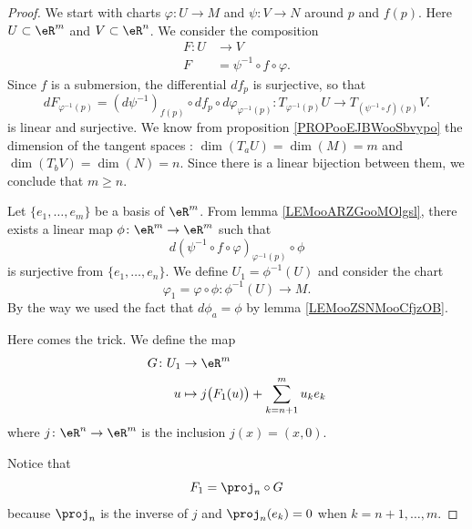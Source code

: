\begin{proof}
	We start with charts \(\varphi \colon U\to M  \) and \(\psi \colon V\to N  \) around \( p\) and \( f(p)\). Here \( U\subset \eR^m\) and \( V\subset \eR^n\). We consider the composition
	\begin{equation}
		\begin{aligned}
			F\colon U & \to V                            \\
			F         & = \psi^{-1}\circ f\circ \varphi.
		\end{aligned}
	\end{equation}
	Since \( f\) is a submersion, the differential \( df_p\) is surjective, so that
	\begin{equation}
		dF_{\varphi^{-1}(p)}=(d\psi^{-1})_{f(p)}\circ df_p\circ d\varphi_{\varphi^{-1}(p)}\colon T_{\varphi^{-1}(p)}U\to T_{(\psi^{-1}\circ f)(p)}V.
	\end{equation}
	is linear and surjective. We know from proposition \ref{PROPooEJBWooSbvypo} the dimension of the tangent spaces : \( \dim(T_aU)=\dim(M)=m\) and \( \dim(T_bV)=\dim(N)=n\). Since there is a linear bijection between them, we conclude that \( m\geq n\).

	Let \( \{ e_1,\ldots,e_m \}\) be a basis of \( \eR^m\). From lemma \ref{LEMooARZGooMOlgsl}, there exists a linear map \(\phi \colon \eR^m\to \eR^m  \) such that
	\begin{equation}
		d(\psi^{-1}\circ f\circ \varphi)_{\varphi^{-1}(p)}\circ \phi
	\end{equation}
	is surjective from \( \{ e_1,\ldots,e_n \}\). We define \( U_1=\phi^{-1}(U)\) and consider the chart
	\begin{equation}
		\varphi_1=\varphi\circ\phi \colon \phi^{-1}(U)\to M.
	\end{equation}
	By the way we used the fact that \( d\phi_a=\phi\) by lemma \ref{LEMooZSNMooCfjzOB}.

	Here comes the trick. We define the map
	\begin{equation}
		\begin{aligned}
			G\colon U_1 & \to \eR^m                                        \\
			u           & \mapsto j\big( F_1(u) \big)+\sum_{k=n+1}^mu_ke_k
		\end{aligned}
	\end{equation}
	where \(j \colon \eR^n\to \eR^m  \) is the inclusion \( j(x)=(x,0)\).

	Notice that
	\begin{equation}		\label{EQooKPCIooUInUbX}
		F_1=\proj_n\circ G
	\end{equation}
	because \( \proj_n\) is the inverse of \( j\) and \( \proj_n(e_k)=0\) when \( k=n+1,\ldots,m\).


\end{proof}
